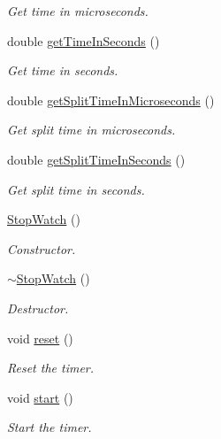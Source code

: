 \begin{DoxyCompactItemize}
\begin{DoxyCompactList}\small\item\em Get time in microseconds. \end{DoxyCompactList}\item 
double \mbox{\hyperlink{classUtil_1_1StopWatch_ab0bc68fe69855bd73f27cd8f4fa0a8c4}{get\+Time\+In\+Seconds}} ()
\begin{DoxyCompactList}\small\item\em Get time in seconds. \end{DoxyCompactList}\item 
double \mbox{\hyperlink{classUtil_1_1StopWatch_a5901023b831c6670d4184a9c6e85ff75}{get\+Split\+Time\+In\+Microseconds}} ()
\begin{DoxyCompactList}\small\item\em Get split time in microseconds. \end{DoxyCompactList}\item 
double \mbox{\hyperlink{classUtil_1_1StopWatch_aa0934b52920e4075317c6176675efb95}{get\+Split\+Time\+In\+Seconds}} ()
\begin{DoxyCompactList}\small\item\em Get split time in seconds. \end{DoxyCompactList}\item 
\mbox{\hyperlink{classUtil_1_1StopWatch_a7eeb59348e5efff8490d2e8e95b0f126}{Stop\+Watch}} ()
\begin{DoxyCompactList}\small\item\em Constructor. \end{DoxyCompactList}\item 
\mbox{\hyperlink{classUtil_1_1StopWatch_a149387c10f6c5da60cfde6de5173278b}{$\sim$\+Stop\+Watch}} ()
\begin{DoxyCompactList}\small\item\em Destructor. \end{DoxyCompactList}\item 
void \mbox{\hyperlink{classUtil_1_1StopWatch_a59e537525567ed9e0701635fb60148b7}{reset}} ()
\begin{DoxyCompactList}\small\item\em Reset the timer. \end{DoxyCompactList}\item 
void \mbox{\hyperlink{classUtil_1_1StopWatch_a87db8057d5ddf177cfcc9ae497337d13}{start}} ()
\begin{DoxyCompactList}\small\item\em Start the timer. \end{DoxyCompactList}\item 

\end{DoxyCompactItemize}
